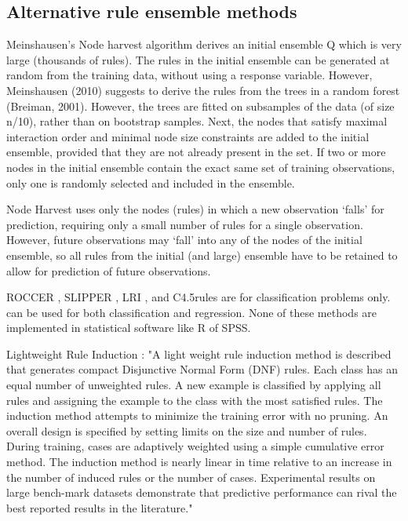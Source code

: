 \documentclass[nobf,doc]{apa}
\begin{document}
\subsection{Alternative rule ensemble methods}

Meinshausen's Node harvest algorithm derives an initial ensemble Q which is very large (thousands of rules). The rules in the initial ensemble can be generated at random from the training data, without using a response variable. However, Meinshausen (2010) suggests to derive the rules from the trees in a random forest (Breiman, 2001). However, the trees are fitted on subsamples of the data (of size n/10), rather than on bootstrap samples. Next, the nodes that satisfy maximal interaction order and minimal node size constraints are added to the initial ensemble, provided that they are not already present in the set. If two or more nodes in the initial ensemble contain the exact same set of training observations, only one is randomly selected and included in the ensemble. 

Node Harvest uses only the nodes (rules) in which a new observation `falls' for prediction, requiring only a small number of rules for a single observation. However, future observations may `fall' into any of the nodes of the initial ensemble, so all rules from the initial (and large) ensemble have to be retained to allow for prediction of future observations. 

ROCCER \cite{PratyFlac05}, SLIPPER \cite{CoheySing99}, LRI \cite{WeisyIndu00}, and C4.5rules \cite{Quin14} are for classification problems only. \cite{DembyKotl10} can be used for both classification and regression. None of these methods are implemented in statistical software like R of SPSS. 

Lightweight Rule Induction \cite{WeisyIndu00}: "A light weight rule induction method is described that generates compact Disjunctive Normal Form (DNF) rules. Each class has an equal number of unweighted rules. A new example is classified by applying all rules and assigning the example to the class with the most satisfied rules. The induction method attempts to minimize the training error with no pruning. An overall design is specified by setting limits on the size and number of rules. During training, cases are adaptively weighted using a simple cumulative error method. The induction method is nearly linear in time relative to an increase in the number of induced rules or the number of cases. Experimental results on large bench-mark datasets demonstrate that predictive performance can rival the best reported results in the literature."
\end{document}

